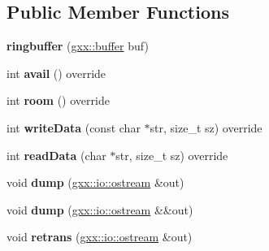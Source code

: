 \subsection*{Public Member Functions}
\begin{DoxyCompactItemize}
\item 
{\bfseries ringbuffer} (\hyperlink{classgxx_1_1buffer}{gxx\+::buffer} buf)\hypertarget{classgxx_1_1io_1_1ringbuffer_aa03b7396bf9c0819917584c868d70a91}{}\label{classgxx_1_1io_1_1ringbuffer_aa03b7396bf9c0819917584c868d70a91}

\item 
int {\bfseries avail} () override\hypertarget{classgxx_1_1io_1_1ringbuffer_aeca97dc05c5ddf80a32d28bd21ef52ad}{}\label{classgxx_1_1io_1_1ringbuffer_aeca97dc05c5ddf80a32d28bd21ef52ad}

\item 
int {\bfseries room} () override\hypertarget{classgxx_1_1io_1_1ringbuffer_a5abd4318791075f8586de9128191103b}{}\label{classgxx_1_1io_1_1ringbuffer_a5abd4318791075f8586de9128191103b}

\item 
int {\bfseries write\+Data} (const char $\ast$str, size\+\_\+t sz) override\hypertarget{classgxx_1_1io_1_1ringbuffer_a2263c6c3aa4625b86e3e32fa81060213}{}\label{classgxx_1_1io_1_1ringbuffer_a2263c6c3aa4625b86e3e32fa81060213}

\item 
int {\bfseries read\+Data} (char $\ast$str, size\+\_\+t sz) override\hypertarget{classgxx_1_1io_1_1ringbuffer_a0cdd70400a55181d2837bc0d45c26055}{}\label{classgxx_1_1io_1_1ringbuffer_a0cdd70400a55181d2837bc0d45c26055}

\item 
void {\bfseries dump} (\hyperlink{classgxx_1_1io_1_1ostream}{gxx\+::io\+::ostream} \&out)\hypertarget{classgxx_1_1io_1_1ringbuffer_a6d87fdd869f9330a803e482945fd6164}{}\label{classgxx_1_1io_1_1ringbuffer_a6d87fdd869f9330a803e482945fd6164}

\item 
void {\bfseries dump} (\hyperlink{classgxx_1_1io_1_1ostream}{gxx\+::io\+::ostream} \&\&out)\hypertarget{classgxx_1_1io_1_1ringbuffer_a738fb0a9a2bccbe9d55ea0756b6feeaf}{}\label{classgxx_1_1io_1_1ringbuffer_a738fb0a9a2bccbe9d55ea0756b6feeaf}

\item 
void {\bfseries retrans} (\hyperlink{classgxx_1_1io_1_1ostream}{gxx\+::io\+::ostream} \&out)\hypertarget{classgxx_1_1io_1_1ringbuffer_a8890c580b944e29a733b68e19fb47aeb}{}\label{classgxx_1_1io_1_1ringbuffer_a8890c580b944e29a733b68e19fb47aeb}


\end{DoxyCompactItemize}
